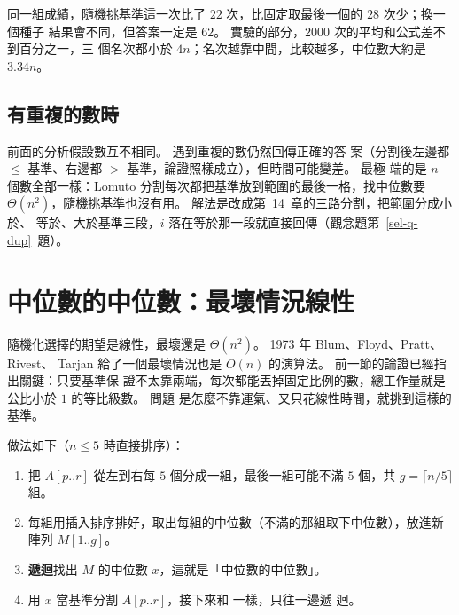 
同一組成績，隨機挑基準這一次比了 $22$ 次，比固定取最後一個的 $28$ 次少；換一個種子
結果會不同，但答案一定是 $62$。 實驗的部分，$2000$ 次的平均和公式差不到百分之一，三
個名次都小於 $4n$；名次越靠中間，比較越多，中位數大約是 $3.34n$。

\subsection{有重複的數時}

前面的分析假設數互不相同。  遇到重複的數仍然回傳正確的答
案（分割後左邊都 $\le$ 基準、右邊都 $>$ 基準，論證照樣成立），但時間可能變差。 最極
端的是 $n$ 個數全部一樣：Lomuto 分割每次都把基準放到範圍的最後一格，找中位數要
$\Theta(n^2)$，隨機挑基準也沒有用。 解法是改成第~14~章的三路分割，把範圍分成小於、
等於、大於基準三段，$i$ 落在等於那一段就直接回傳（觀念題第~\ref{sel-q-dup}~題）。

\section{中位數的中位數：最壞情況線性}
\label{sec:sel-mom}

隨機化選擇的期望是線性，最壞還是 $\Theta(n^2)$。 1973 年 Blum、Floyd、Pratt、Rivest、
Tarjan 給了一個最壞情況也是 $O(n)$ 的演算法。 前一節的論證已經指出關鍵：只要基準保
證不太靠兩端，每次都能丟掉固定比例的數，總工作量就是公比小於 $1$ 的等比級數。 問題
是怎麼不靠運氣、又只花線性時間，就挑到這樣的基準。

做法如下（$n \le 5$ 時直接排序）：

\begin{enumerate}
\item 把 $A[p..r]$ 從左到右每 $5$ 個分成一組，最後一組可能不滿 $5$ 個，共
$g = \lceil n/5 \rceil$ 組。
\item 每組用插入排序排好，取出每組的中位數（不滿的那組取下中位數），放進新陣列
$M[1..g]$。
\item \textbf{遞迴}找出 $M$ 的中位數 $x$，這就是「中位數的中位數」。
\item 用 $x$ 當基準分割 $A[p..r]$，接下來和  一樣，只往一邊遞
迴。
\end{enumerate}

